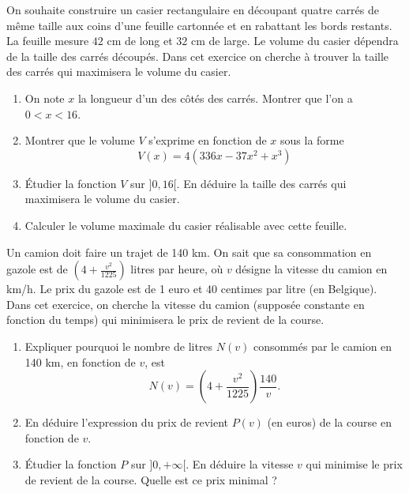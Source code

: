 \begin{exo}


    On souhaite construire un casier rectangulaire en découpant quatre carrés de même taille aux coins d'une feuille cartonnée et en rabattant les bords restants. La feuille mesure $42$ cm de long et $32$ cm de large. Le volume du casier dépendra de la taille des carrés découpés. Dans cet exercice on cherche à trouver la taille des carrés qui maximisera le volume du casier.

    \begin{enumerate}
        \item On note $x$ la longueur d'un des côtés des carrés. Montrer que l'on a $0 < x < 16$.

        \item Montrer que le volume $V$ s'exprime en fonction de $x$ sous la forme
        $$ V(x) = 4(336x - 37x^2 + x^3) $$

        \item Étudier la fonction $V$ sur $]0,16[$. En déduire la taille des carrés qui maximisera le volume du casier.

        \item Calculer le volume maximale du casier réalisable avec cette feuille.
    \end{enumerate}
\end{exo}

\begin{exo}
    Un camion doit faire un trajet de 140 km. On sait que sa consommation en gazole est de $(4 + \frac{v^2}{1225})$ litres par heure, où $v$ désigne la vitesse du camion en km/h. Le prix du gazole est de 1 euro et 40 centimes par litre (en Belgique). Dans cet exercice, on cherche la vitesse du camion (supposée constante en fonction du temps) qui minimisera le prix de revient de la course.
    \begin{enumerate}
        \item Expliquer pourquoi le nombre de litres $N(v)$ consommés par le camion en 140 km, en fonction de $v$, est
            $$
                N(v) = (4 + \frac{v^2}{1225}) \frac{140}{v}.
            $$
        \item En déduire l'expression du prix de revient $P(v)$ (en euros) de la course en fonction de $v$.
        \item Étudier la fonction $P$ sur $]0,+\infty[$. En déduire la vitesse $v$ qui minimise le prix de revient de la course. Quelle est ce prix minimal ?
    \end{enumerate}
\end{exo}

